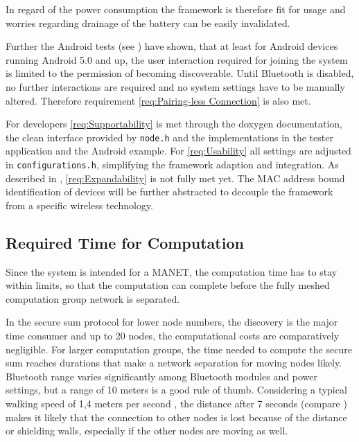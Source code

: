 In regard of the power consumption the framework is therefore fit for usage and worries regarding drainage of the battery can be easily invalidated.

Further the Android tests (see ) have shown, that at least for Android devices running Android 5.0 and up, the user interaction required for joining the system is limited to the permission of becoming discoverable. Until Bluetooth is disabled, no further interactions are required and no system settings have to be manually altered. Therefore requirement \ref{req:Pairing-less Connection} is also met.

For developers \ref{req:Supportability} is met through the doxygen documentation, the clean interface provided by \lstinline|node.h| and the implementations in the tester application and the Android example. For \ref{req:Usability} all settings are adjusted in \lstinline|configurations.h|, simplifying the framework adaption and integration. 
As described in , \ref{req:Expandability} is not fully met yet. The \gls{MAC} address bound identification of devices will be further abstracted to decouple the framework from a specific wireless technology.

\subsection{Required Time for Computation}

Since the system is intended for a \gls{MANET}, the computation time has to stay within limits, so that the computation can complete before the fully meshed computation group network is separated.

In the secure sum protocol for lower node numbers, the discovery is the major time consumer and up to 20 nodes, the computational costs are comparatively negligible. For larger computation groups, the time needed to compute the secure sum reaches durations that make a network separation for moving nodes likely. Bluetooth range varies significantly among Bluetooth modules and power settings, but a range of 10 meters is a good rule of thumb. Considering a typical walking speed of 1,4 meters per second \autocite{Mohler2007}, the distance after 7 seconds (compare ) makes it likely that the connection to other nodes is lost because of the distance or shielding walls, especially if the other nodes are moving as well.

